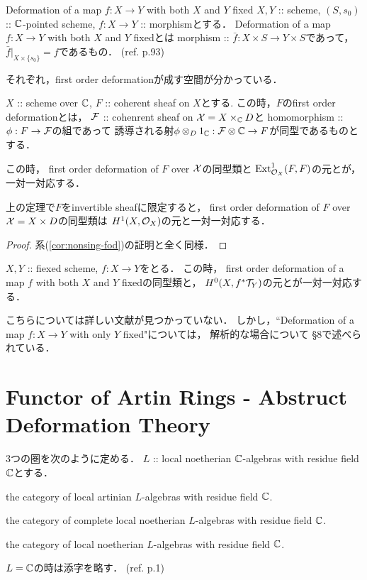 \documentclass[a4paper]{jsarticle}
\newcommand{\LA}{\mathrm{(LA)}}
\newcommand{\LN}{\mathrm{(LN)}}
\newcommand{\CLN}{\mathrm{(CLN)}}
\newcommand{\defX}{\mathcal{X}}
\begin{document}
    \begin{itembox}[l]{Deformation of a map $f: X \to Y$ with both $X$ and $Y$ fixed}
        $X, Y$ :: scheme,
        $(S, s_0)$ :: $\mathbb{C}$-pointed scheme,
        $f: X \to Y$ :: morphismとする．
        Deformation of a map $f: X \to Y$ with both $X$ and $Y$ fixedとは
        morphism :: $\bar{f} : X \times S \to Y \times S$であって，
        $\bar{f}|_{X \times \{s_0\}}=f$であるもの．
        (ref. \cite{HaMo}p.93)
    \end{itembox}

    それぞれ，first order deformationが成す空間が分かっている．
    \begin{Thm}
        $X$ :: scheme over $\mathbb{C}$,
        $F$ :: coherent sheaf on $X$とする.
        この時，$F$のfirst order deformationとは，
        $\mathcal{F}$ :: cohenrent sheaf on $\defX=X \times_{\C} D$と
        homomorphism :: $\phi: F \to \mathcal{F}$の組であって
        誘導される射$\phi \otimes_{D} 1_{\mathbb{C}}: \mathcal{F} \otimes \mathbb{C} \to F$が同型であるものとする．

        この時，
        first order deformation of $F$ over $\mathcal{X}$の同型類と
        $\operatorname{Ext}^1_{\mathcal{O}_X}(F, F)$の元とが，一対一対応する．
    \end{Thm}

    \begin{Cor}
        上の定理で$F$をinvertible sheafに限定すると，
        first order deformation of $F$ over $\mathcal{X}=X \times D$の同型類は
        $H^1(X, \mathcal{O}_X)$の元と一対一対応する．
    \end{Cor}
    \begin{proof}
        系(\ref{cor:nonsing-fod})の証明と全く同様．
    \end{proof}
    
    \begin{Thm}
        $X, Y$ :: fiexed scheme, 
        $f: X \to Y$をとる．
        この時，
        first order deformation of a map $f$ with both $X$ and $Y$ fixedの同型類と，
        $H^0(X, f^*\mathcal{T}_Y)$の元とが一対一対応する．
    \end{Thm}
    こちらについては詳しい文献が見つかっていない．
    しかし，``Deformation of a map $f: X \to Y$ with only $Y$ fixed"については，
    解析的な場合について\cite{GACII} \S 8で述べられている．

\section{Functor of Artin Rings - Abstruct Deformation Theory}
    $3$つの圏を次のように定める．
    $L$ :: local noetherian $\mathbb{C}$-algebras with residue field $\mathbb{C}$とする．
    \begin{description}[labelindent=1cm]
        \item[$\LA_{L}$:]  the category of local artinian $L$-algebras with residue field $\mathbb{C}$.
        \item[$\CLN_{L}$:] the category of complete local noetherian $L$-algebras with residue field $\mathbb{C}$.
        \item[$\LN_{L}$:]  the category of local noetherian $L$-algebras with residue field $\mathbb{C}$.
    \end{description}
    $L=\mathbb{C}$の時は添字を略す．
    (ref. \cite{DefAS} p.1)
\end{document}

